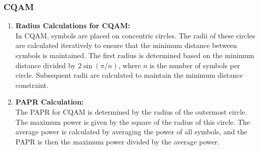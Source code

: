 \documentclass[11pt,a4paper,oneside]{article}
\begin{document}
\subsubsection{CQAM}
\begin{enumerate}[itemsep=2ex, left=0pt, labelwidth=2em, align=left]
    \item \textbf{Radius Calculations for CQAM:}\\
    In CQAM, symbols are placed on concentric circles. The radii of these circles are calculated iteratively to ensure that the minimum distance between symbols is maintained. The first radius is determined based on the minimum distance divided by \(2 \sin(\pi / n)\), where \(n\) is the number of symbols per circle. Subsequent radii are calculated to maintain the minimum distance constraint.
    
    \vspace{1ex}
    
    \item \textbf{PAPR Calculation:}\\
    The PAPR for CQAM is determined by the radius of the outermost circle. The maximum power is given by the square of the radius of this circle. The average power is calculated by averaging the power of all symbols, and the PAPR is then the maximum power divided by the average power.
\end{enumerate}
\end{document}

